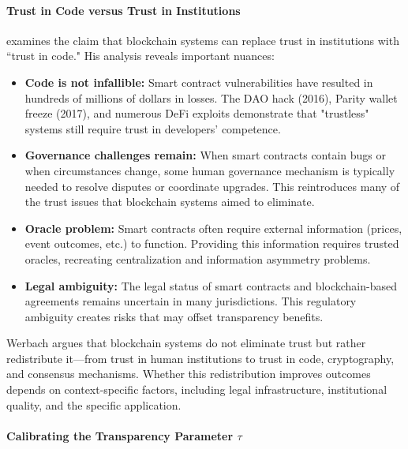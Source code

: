 \paragraph{Trust in Code versus Trust in Institutions}

 examines the claim that blockchain systems can replace trust in institutions with ``trust in code." His analysis reveals important nuances:

\begin{itemize}
    \item \textbf{Code is not infallible:} Smart contract vulnerabilities have resulted in hundreds of millions of dollars in losses. The DAO hack (2016), Parity wallet freeze (2017), and numerous DeFi exploits demonstrate that "trustless" systems still require trust in developers' competence.
    
    \item \textbf{Governance challenges remain:} When smart contracts contain bugs or when circumstances change, some human governance mechanism is typically needed to resolve disputes or coordinate upgrades. This reintroduces many of the trust issues that blockchain systems aimed to eliminate.
    
    \item \textbf{Oracle problem:} Smart contracts often require external information (prices, event outcomes, etc.) to function. Providing this information requires trusted oracles, recreating centralization and information asymmetry problems.
    
    \item \textbf{Legal ambiguity:} The legal status of smart contracts and blockchain-based agreements remains uncertain in many jurisdictions. This regulatory ambiguity creates risks that may offset transparency benefits.
\end{itemize}

Werbach argues that blockchain systems do not eliminate trust but rather redistribute it—from trust in human institutions to trust in code, cryptography, and consensus mechanisms. Whether this redistribution improves outcomes depends on context-specific factors, including legal infrastructure, institutional quality, and the specific application.

\paragraph{Calibrating the Transparency Parameter $\tau$}

